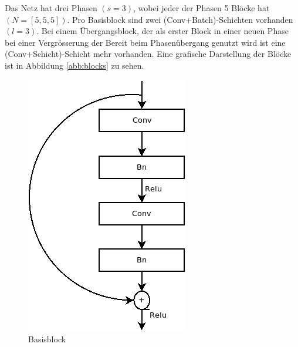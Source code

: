 Das Netz hat drei Phasen $(s=3)$, wobei jeder der Phasen 5 Blöcke hat $(N=[5,5,5])$. Pro Basisblock sind zwei (Conv+Batch)-Schichten vorhanden $(l=3)$. Bei einem Übergangsblock, der als erster Block in einer neuen Phase bei einer Vergrösserung der Bereit beim Phasenübergang genutzt wird ist eine (Conv+Schicht)-Schicht mehr vorhanden. Eine grafische Darstellung der Blöcke ist in Abbildung \ref{abb:blocks} zu sehen.




\begin{figure}[h]
   \begin{minipage}[b]{.4\linewidth} %
      \includegraphics[width=0.8\linewidth]{KapitelPartB/Images/Basisblock.png}
      \caption{Basisblock}
   \end{minipage}
   \hspace{.1\linewidth}%
   \begin{minipage}[b]{.4\linewidth} %

\end{minipage}
\end{figure}

